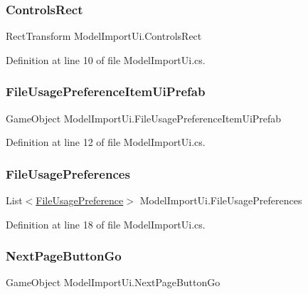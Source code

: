\subsubsection{\texorpdfstring{ControlsRect}{ControlsRect}}
{\footnotesize\ttfamily Rect\+Transform Model\+Import\+Ui.\+Controls\+Rect}



Definition at line 10 of file Model\+Import\+Ui.\+cs.

\mbox{\label{class_model_import_ui_aa7ced6e944b3736ed16f88abfdb5b7a2}} 
\subsubsection{\texorpdfstring{FileUsagePreferenceItemUiPrefab}{FileUsagePreferenceItemUiPrefab}}
{\footnotesize\ttfamily Game\+Object Model\+Import\+Ui.\+File\+Usage\+Preference\+Item\+Ui\+Prefab}



Definition at line 12 of file Model\+Import\+Ui.\+cs.

\mbox{\label{class_model_import_ui_a720330a11dc2f26d2e39e8c18ade9aff}} 
\subsubsection{\texorpdfstring{FileUsagePreferences}{FileUsagePreferences}}
{\footnotesize\ttfamily List$<$\mbox{\hyperlink{class_file_usage_preference}{File\+Usage\+Preference}}$>$ Model\+Import\+Ui.\+File\+Usage\+Preferences}



Definition at line 18 of file Model\+Import\+Ui.\+cs.

\mbox{\label{class_model_import_ui_a8598a05c1c3f7317ffd9fefc771dab0f}} 
\subsubsection{\texorpdfstring{NextPageButtonGo}{NextPageButtonGo}}
{\footnotesize\ttfamily Game\+Object Model\+Import\+Ui.\+Next\+Page\+Button\+Go}



